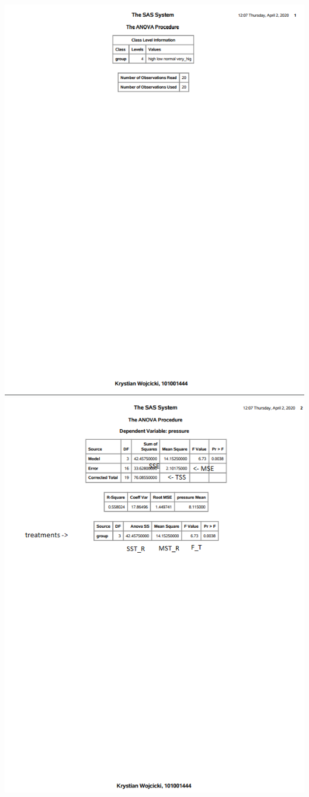 \documentclass{article}
\begin{document}
\begin{enumerate}[1.]
\begin{center}
\includegraphics[scale=1]{a4_sas1}
\includegraphics[scale=1]{a4_sas2} \\

\end{center}
\end{enumerate}
\end{document}
